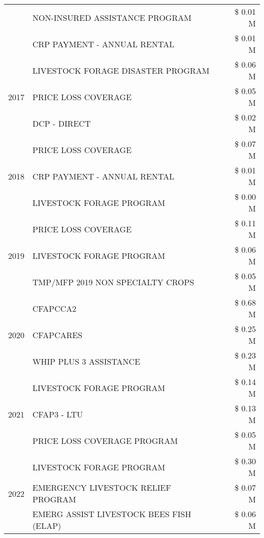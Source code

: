 \begin{tabular}{llr}
 & NON-INSURED ASSISTANCE PROGRAM & \$ 0.01 M \\
 & CRP PAYMENT - ANNUAL RENTAL & \$ 0.01 M \\
\cline{1-3}
\multirow[t]{3}{*}{2017} & LIVESTOCK FORAGE DISASTER PROGRAM & \$ 0.06 M \\
 & PRICE LOSS COVERAGE & \$ 0.05 M \\
 & DCP - DIRECT & \$ 0.02 M \\
\cline{1-3}
\multirow[t]{3}{*}{2018} & PRICE LOSS COVERAGE & \$ 0.07 M \\
 & CRP PAYMENT - ANNUAL RENTAL & \$ 0.01 M \\
 & LIVESTOCK FORAGE PROGRAM & \$ 0.00 M \\
\cline{1-3}
\multirow[t]{3}{*}{2019} & PRICE LOSS COVERAGE & \$ 0.11 M \\
 & LIVESTOCK FORAGE PROGRAM & \$ 0.06 M \\
 & TMP/MFP 2019 NON SPECIALTY CROPS & \$ 0.05 M \\
\cline{1-3}
\multirow[t]{3}{*}{2020} & CFAPCCA2 & \$ 0.68 M \\
 & CFAPCARES & \$ 0.25 M \\
 & WHIP PLUS 3 ASSISTANCE & \$ 0.23 M \\
\cline{1-3}
\multirow[t]{3}{*}{2021} & LIVESTOCK FORAGE PROGRAM & \$ 0.14 M \\
 & CFAP3 - LTU & \$ 0.13 M \\
 & PRICE LOSS COVERAGE PROGRAM & \$ 0.05 M \\
\cline{1-3}
\multirow[t]{3}{*}{2022} & LIVESTOCK FORAGE PROGRAM & \$ 0.30 M \\
 & EMERGENCY LIVESTOCK RELIEF PROGRAM & \$ 0.07 M \\
 & EMERG ASSIST LIVESTOCK BEES FISH (ELAP) & \$ 0.06 M \\
\cline{1-3}
\bottomrule
\end{tabular}
